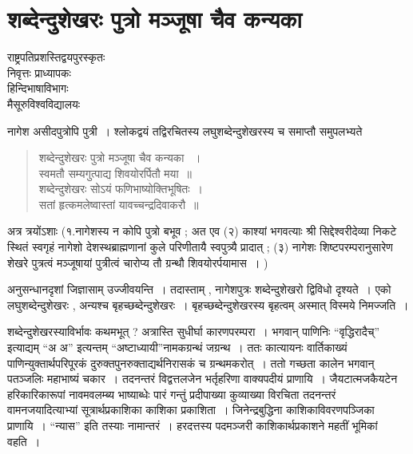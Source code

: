 {\fontsize{15}{17}\selectfont
\chapter{शब्देन्दुशेखरः पुत्रो मञ्जूषा चैव कन्यका}

\begin{center}
\smallskip

राष्ट्रपतिप्रशस्तिद्वयपुरस्कृतः\\
निवृत्तः प्राध्यापकः\\
हिन्दिभाषाविभागः\\
मैसूरुविश्वविद्यालयः
\addrule
\end{center}

नागेश असीदपुत्रोपि पुत्री~। श्लोकद्वयं तद्विरचितस्य लघुशब्देन्दुशेखरस्य च समाप्तौ समुपलभ्यते

\begin{verse}
शब्देन्दुशेखरः पुत्रो मञ्जूषा चैव कन्यका ~। \\
स्वमतौ सम्यगुत्पाद्य शिवयोरर्पितौ मया~॥\\
शब्देन्दुशेखरः सोऽयं फणिभाष्योक्तिभूषितः~। \\
सतां हृत्कमलेष्वास्तां यावच्चन्द्रदिवाकरौ~॥
\end{verse}

अत्र त्रयोंऽशाः (१.नागेशस्य न कोपि पुत्रो बभूव ; अत एव (२) काश्यां भगवत्याः श्री सिद्देश्वरीदेव्या निकटे स्थितं स्वगृहं नागेशो देशस्थब्राह्मणानां कुले परिणीतायै स्वपुत्र्यै प्रादात् ; (३) नागेशः शिष्टपरम्परानुसारेण शेखरे पुत्रत्वं मञ्जूषायां पुत्रीत्वं चारोप्य तौ ग्रन्थौ शिवयोरर्पयामास~। )  

अनुसन्धानदृशां जिज्ञासाम् उज्जीवयन्ति~। तदास्ताम् , नागेशपुत्रः शब्देन्दुशेखरो द्विविधो दृश्यते~। एको लघुशब्देन्दुशेखरः , अन्यश्च बृहच्छब्देन्दुशेखरः~। बृहच्छब्देन्दुशेखरस्य बृहत्वम् अस्मात् विस्मये निमज्जति~। 

शब्देन्दुशेखरस्याविर्भावः कथमभूत् ? अत्रास्ति सुधीर्घा कारणपरम्परा~। भगवान् पाणिनिः “वृद्धिरादैच्” इत्याद्यम् “अ अ” इत्यन्तम् “अष्टाध्यायी”नामकग्रन्थं जग्रन्थ~। ततः कात्यायनः वार्तिकाख्यं पाणिन्युक्तार्थपरिपूरकं दुरुक्तपुनरुक्ताद्यर्थनिरासकं च ग्रन्थमकरोत्~। ततो गच्छता कालेन भगवान् पतञ्जलिः महाभाष्यं चकार~। तदनन्तरं विद्वत्तलजेन भर्तृहरिणा वाक्यपदीयं प्राणायि~। जैयटात्मजकैयटेन हरिकारिकारूपां नावमवलम्ब्य भाष्याब्धेः पारं गन्तुं प्रदीपाख्या कुव्याख्या विरचिता तदनन्तरं वामनजयादित्याभ्यां सूत्रार्थप्रकाशिका काशिका प्रकाशिता~। जिनेन्द्रबुद्धिना काशिकाविवरणपञ्जिका प्राणायि~। “न्यास” इति तस्याः नामान्तरं~। हरदत्तस्य पदमञ्जरी काशिकार्थप्रकाशने महतीं भूमिकां वहति~। 

}
